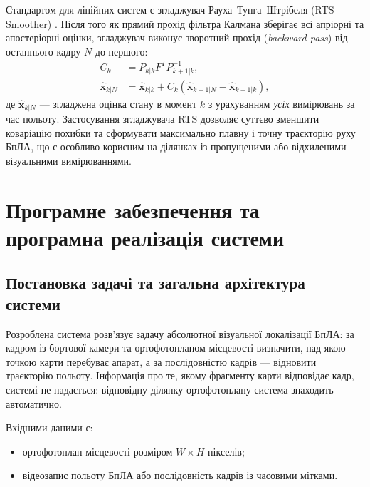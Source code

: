 \documentclass[a4paper, 12pt, titlepage]{article}
\begin{document}
Стандартом для лінійних систем є згладжувач Рауха–Тунга–Штрібеля (RTS Smoother) \cite{rts}. Після того як прямий прохід фільтра Калмана зберігає всі апріорні та апостеріорні оцінки, згладжувач виконує зворотний прохід (\textit{backward pass}) від останнього кадру $N$ до першого:
\begin{align}
C_k &= P_{k|k} F^T P_{k+1|k}^{-1}, \\
\hat{\mathbf{x}}_{k|N} &= \hat{\mathbf{x}}_{k|k} + C_k (\hat{\mathbf{x}}_{k+1|N} - \hat{\mathbf{x}}_{k+1|k}),
\end{align}
де $\hat{\mathbf{x}}_{k|N}$ --- згладжена оцінка стану в момент $k$ з урахуванням \textit{усіх} вимірювань за час польоту. Застосування згладжувача RTS дозволяє суттєво зменшити коваріацію похибки та сформувати максимально плавну і точну траєкторію руху БпЛА, що є особливо корисним на ділянках із пропущеними або відхиленими візуальними вимірюваннями.




\providecommand{\px}{пкс}               %
\providecommand{\code}[1]{\texttt{#1}}  %
\newpage
\section{Програмне забезпечення та програмна реалізація системи}
\label{sec:implementation}

\subsection{Постановка задачі та загальна архітектура системи}

Розроблена система розв'язує задачу абсолютної візуальної локалізації БпЛА: за кадром із бортової камери та ортофотопланом місцевості визначити, над якою точкою карти перебуває апарат, а за послідовністю кадрів --- відновити траєкторію польоту. Інформація про те, якому фрагменту карти відповідає кадр, системі не надається: відповідну ділянку ортофотоплану система знаходить автоматично.

Вхідними даними є:
\begin{itemize}
    \item ортофотоплан місцевості розміром $W \times H$ пікселів;
    \item відеозапис польоту БпЛА або послідовність кадрів із часовими мітками.
\end{itemize}
\end{document}
